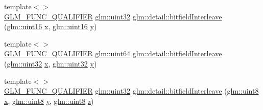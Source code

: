 \begin{DoxyCompactItemize}
\item 
{\footnotesize template$<$$>$ }\\\mbox{\hyperlink{setup_8hpp_a33fdea6f91c5f834105f7415e2a64407}{G\+L\+M\+\_\+\+F\+U\+N\+C\+\_\+\+Q\+U\+A\+L\+I\+F\+I\+ER}} \mbox{\hyperlink{group__gtc__type__precision_ga202b6a53c105fcb7e531f9b443518451}{glm\+::uint32}} \mbox{\hyperlink{namespaceglm_1_1detail_ac5f2b38221d4447775e88f1b003f8113}{glm\+::detail\+::bitfield\+Interleave}} (\mbox{\hyperlink{group__gtc__type__precision_gad8c2939e1fdd8e5828b31d95c52255d5}{glm\+::uint16}} \mbox{\hyperlink{_s_d_l__opengl_8h_ad0e63d0edcdbd3d79554076bf309fd47}{x}}, \mbox{\hyperlink{group__gtc__type__precision_gad8c2939e1fdd8e5828b31d95c52255d5}{glm\+::uint16}} \mbox{\hyperlink{_s_d_l__opengl_8h_a1675d9d7bb68e1657ff028643b4037e3}{y}})
\item 
{\footnotesize template$<$$>$ }\\\mbox{\hyperlink{setup_8hpp_a33fdea6f91c5f834105f7415e2a64407}{G\+L\+M\+\_\+\+F\+U\+N\+C\+\_\+\+Q\+U\+A\+L\+I\+F\+I\+ER}} \mbox{\hyperlink{group__gtc__type__precision_gae3632bf9b37da66233d78930dd06378a}{glm\+::uint64}} \mbox{\hyperlink{namespaceglm_1_1detail_a7f40bc91b3d293fae0f7df8de85cdcc6}{glm\+::detail\+::bitfield\+Interleave}} (\mbox{\hyperlink{group__gtc__type__precision_ga202b6a53c105fcb7e531f9b443518451}{glm\+::uint32}} \mbox{\hyperlink{_s_d_l__opengl_8h_ad0e63d0edcdbd3d79554076bf309fd47}{x}}, \mbox{\hyperlink{group__gtc__type__precision_ga202b6a53c105fcb7e531f9b443518451}{glm\+::uint32}} \mbox{\hyperlink{_s_d_l__opengl_8h_a1675d9d7bb68e1657ff028643b4037e3}{y}})
\item 
{\footnotesize template$<$$>$ }\\\mbox{\hyperlink{setup_8hpp_a33fdea6f91c5f834105f7415e2a64407}{G\+L\+M\+\_\+\+F\+U\+N\+C\+\_\+\+Q\+U\+A\+L\+I\+F\+I\+ER}} \mbox{\hyperlink{group__gtc__type__precision_ga202b6a53c105fcb7e531f9b443518451}{glm\+::uint32}} \mbox{\hyperlink{namespaceglm_1_1detail_a27e9c62ce3ad180236573daec6a6461f}{glm\+::detail\+::bitfield\+Interleave}} (\mbox{\hyperlink{group__gtc__type__precision_ga1a7dcd8aac97cc8020817c94049deff2}{glm\+::uint8}} \mbox{\hyperlink{_s_d_l__opengl_8h_ad0e63d0edcdbd3d79554076bf309fd47}{x}}, \mbox{\hyperlink{group__gtc__type__precision_ga1a7dcd8aac97cc8020817c94049deff2}{glm\+::uint8}} \mbox{\hyperlink{_s_d_l__opengl_8h_a1675d9d7bb68e1657ff028643b4037e3}{y}}, \mbox{\hyperlink{group__gtc__type__precision_ga1a7dcd8aac97cc8020817c94049deff2}{glm\+::uint8}} \mbox{\hyperlink{_s_d_l__opengl__glext_8h_a5e74030ebb3297ce1b37ff716fedd68f}{z}})
\item 

\end{DoxyCompactItemize}
